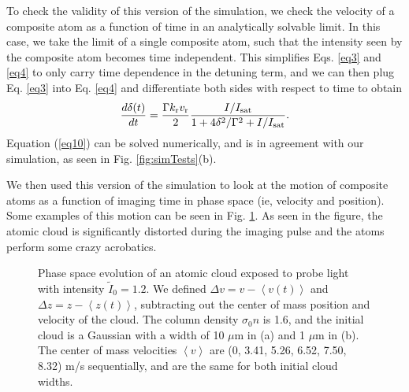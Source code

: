 To check the validity of this version of the simulation, we check the velocity of a composite atom as a function of time in an analytically solvable limit. In this case, we take the limit of a single composite atom, such that the intensity seen by the composite atom becomes time independent. This simplifies  Eqs. \ref{eq3} and \ref{eq4} to only carry time dependence in the detuning term, and we can then plug Eq. \ref{eq3} into Eq. \ref{eq4} and differentiate both sides with respect to time to obtain
%
\begin{equation}
\frac{d\delta(t)}{dt}= \frac{\Gamma k_{\rm{r}} v_{\rm{r}}}{2} \frac{I/I_{\rm{sat}}}{1+4\delta^2/\Gamma^2+I/I_{\rm{sat}}}.
\label{eq10}
\end{equation}
Equation (\ref{eq10}) can be solved numerically, and is in agreement with our simulation, as seen in Fig. \ref{fig:simTests}(b).


We then used this version of the simulation to look at the motion of composite atoms as a function of imaging time in phase space (ie, velocity and position). Some examples of this motion can be seen in  Fig. \ref{fig:phaseSpace}. As seen in the figure, the atomic cloud is significantly distorted during the imaging pulse and the atoms perform some crazy acrobatics. 
\begin{figure}
\caption[Phase space evolution of the atomic cloud]{Phase space evolution of an atomic cloud exposed to probe light with intensity $\tilde{I}_0=1.2$. We defined $\Delta v=v -\left< v(t) \right>$  and $\Delta z=z-\left< z(t) \right>$, subtracting out the center of mass position and velocity of the cloud. The column density $\sigma_0 n$ is 1.6, and the initial cloud is a Gaussian with a width of 10 $\mu$m in (a) and 1 $\mu$m in (b). The center of mass velocities $\left< v\right>$ are (0,  3.41, 5.26, 6.52, 7.50, 8.32) m/s sequentially, and are the same for both initial cloud widths. }
\label{fig:phaseSpace}
\end{figure}


